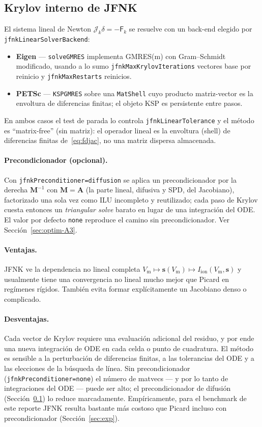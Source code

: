 \documentclass[11pt,a4paper]{article}
\newcommand{\code}[1]{\texttt{\small #1}}
\newcommand{\Vm}{V_{\text{m}}}
\newcommand{\Iion}{I_{\mathrm{ion}}}
\newcommand{\Aimp}{\mathbf{A}}
\newcommand{\Fres}{\mathsf{F}}
\begin{document}
\subsection{Krylov interno de JFNK}
\label{sec:jfnk-krylov}

El sistema lineal de Newton $\mathcal{J}_k\delta=-\Fres_k$ se
resuelve con un back-end elegido por \code{jfnkLinearSolverBackend}:
\begin{itemize}[nosep]
\item \textbf{Eigen} --- \code{solveGMRES} implementa GMRES(m) con Gram--Schmidt
  modificado, usando a lo sumo \code{jfnkMaxKrylovIterations} vectores base por
  reinicio y \code{jfnkMaxRestarts} reinicios.
\item \textbf{PETSc} --- \code{KSPGMRES} sobre una \code{MatShell} cuyo producto
  matriz-vector es la envoltura de diferencias finitas; el objeto KSP es
  persistente entre pasos.
\end{itemize}
En ambos casos el test de parada lo controla \code{jfnkLinearTolerance} y el método
es ``matrix-free'' (sin matriz): el operador lineal es la envoltura (shell) de
diferencias finitas de~\eqref{eq:fdjac}, no una matriz dispersa almacenada.

\paragraph{Precondicionador (opcional).}
Con \code{jfnkPreconditioner=diffusion} se aplica un precondicionador por la derecha
$\mathbf{M}^{-1}$ con $\mathbf{M}=\Aimp$ (la parte lineal, difusiva y SPD, del
Jacobiano), factorizado una sola vez como ILU incompleto y reutilizado; cada paso de
Krylov cuesta entonces un \emph{triangular solve} barato en lugar de una integración
del ODE. El valor por defecto \code{none} reproduce el camino sin precondicionador.
Ver Sección~\ref{sec:optim-A3}.

\paragraph{Ventajas.}
JFNK ve la dependencia no lineal completa
$\Vm\mapsto\mathbf{s}(\Vm)\mapsto\Iion(\Vm,\mathbf{s})$ y usualmente tiene una
convergencia no lineal mucho mejor que Picard en regímenes rígidos. También evita
formar explícitamente un Jacobiano denso o complicado.

\paragraph{Desventajas.}
Cada vector de Krylov requiere una evaluación adicional del residuo, y por ende una
nueva integración de ODE en cada celda o punto de cuadratura. El método es sensible
a la perturbación de diferencias finitas, a las tolerancias del ODE y a las
elecciones de la búsqueda de línea. Sin precondicionador
(\code{jfnkPreconditioner=none}) el número de matvecs --- y por lo tanto de
integraciones del ODE --- puede ser alto; el precondicionador de difusión
(Sección~\ref{sec:jfnk-krylov}) lo reduce marcadamente. Empíricamente, para el
benchmark de este reporte JFNK resulta bastante más costoso que Picard incluso con
precondicionador (Sección~\ref{sec:exp}).
\end{document}
